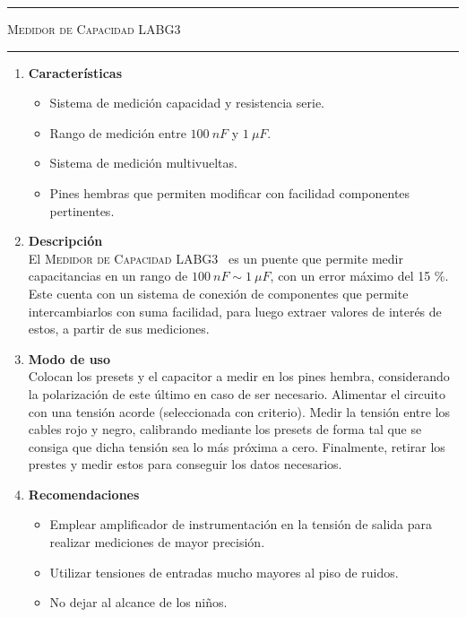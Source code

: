 \begin{center}
\rule{\textwidth}{1pt}
\textsc{Medidor de Capacidad LABG3 \textsuperscript{\textregistered}}
\rule{\textwidth}{1pt}
\end{center}

\begin{multicols}{2}

\begin{enumerate}
	\item[1] \textbf{Características}
	\begin{itemize}
		\item Sistema de medición capacidad y resistencia serie.
		\item Rango de medición entre $100 \ nF$ y $1 \ \mu F$.
		\item Sistema de medición multivueltas.
		\item Pines hembras que permiten modificar con facilidad componentes pertinentes.
	\end{itemize}
	
	\item[2] \textbf{Descripción}\\
		El \textsc{Medidor de Capacidad LABG3~\textsuperscript{\textregistered}} es un puente que permite medir capacitancias en un rango de $100 \ nF \sim 1 \ \mu F$, con un error máximo del 15 \%. Este cuenta con un sistema de conexión de componentes que permite intercambiarlos con suma facilidad, para luego extraer valores de interés de estos, a partir de sus mediciones.
	
	\item[3] \textbf{Modo de uso}\\
	Colocan los presets y el capacitor a medir en los pines hembra, considerando la polarización de este último en caso de ser necesario. Alimentar el circuito con una tensión acorde (seleccionada con criterio). Medir la tensión entre los cables rojo y negro, calibrando mediante los presets de forma tal que se consiga que dicha tensión sea lo más próxima a cero. Finalmente, retirar los prestes y medir estos para conseguir los datos necesarios.
		
	\item[4] \textbf{Recomendaciones}
		\begin{itemize}
		\item Emplear amplificador de instrumentación en la tensión de salida para realizar mediciones de mayor precisión.
		\item Utilizar tensiones de entradas mucho mayores al piso de ruidos.
		\item No dejar al alcance de los niños.
	\end{itemize}

\end{enumerate}
\end{multicols}

